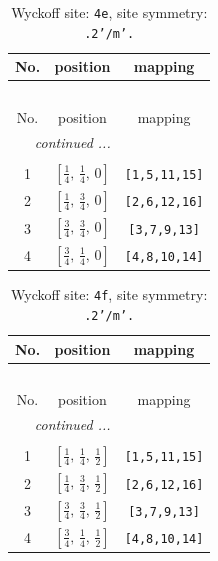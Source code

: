 \documentclass[fleqn,8pt]{jsarticle}
\begin{document}
\renewcommand{\arraystretch}{1.2}
\begin{longtable}{ccc}
\caption{Wyckoff site: {\tt 4e}, site symmetry: {\tt .2'/m'.}}
 \\
 \hline \hline
No. & position & mapping \\ \hline \endfirsthead

\multicolumn{2}{l}{\tablename\ \thetable{}} \\
 \hline \hline
No. & position & mapping \\ \hline \endhead

 \hline \hline
\multicolumn{2}{r}{\footnotesize\it continued ...} \\ \endfoot

 \hline \hline
\multicolumn{2}{r}{} \\ \endlastfoot

1 & $\left[ \frac{1}{4},\, \frac{1}{4},\, 0 \right]$ & {\tt [1,5,11,15]} \\ \hline
2 & $\left[ \frac{1}{4},\, \frac{3}{4},\, 0 \right]$ & {\tt [2,6,12,16]} \\ \hline
3 & $\left[ \frac{3}{4},\, \frac{3}{4},\, 0 \right]$ & {\tt [3,7,9,13]} \\ \hline
4 & $\left[ \frac{3}{4},\, \frac{1}{4},\, 0 \right]$ & {\tt [4,8,10,14]} \\
\end{longtable}
\renewcommand{\arraystretch}{1.2}
\begin{longtable}{ccc}
\caption{Wyckoff site: {\tt 4f}, site symmetry: {\tt .2'/m'.}}
 \\
 \hline \hline
No. & position & mapping \\ \hline \endfirsthead

\multicolumn{2}{l}{\tablename\ \thetable{}} \\
 \hline \hline
No. & position & mapping \\ \hline \endhead

 \hline \hline
\multicolumn{2}{r}{\footnotesize\it continued ...} \\ \endfoot

 \hline \hline
\multicolumn{2}{r}{} \\ \endlastfoot

1 & $\left[ \frac{1}{4},\, \frac{1}{4},\, \frac{1}{2} \right]$ & {\tt [1,5,11,15]} \\ \hline
2 & $\left[ \frac{1}{4},\, \frac{3}{4},\, \frac{1}{2} \right]$ & {\tt [2,6,12,16]} \\ \hline
3 & $\left[ \frac{3}{4},\, \frac{3}{4},\, \frac{1}{2} \right]$ & {\tt [3,7,9,13]} \\ \hline
4 & $\left[ \frac{3}{4},\, \frac{1}{4},\, \frac{1}{2} \right]$ & {\tt [4,8,10,14]} \\
\end{longtable}
\end{document}
